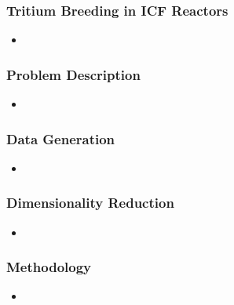 \begin{frame}
	\frametitle{Tritium Breeding in ICF Reactors}
	\begin{itemize}
		\item %
	\end{itemize}
\end{frame}

\begin{frame}
	\frametitle{Problem Description}
	\begin{itemize}
		\item %
	\end{itemize}
\end{frame}

\begin{frame}
	\frametitle{Data Generation}
	\begin{itemize}
		\item %
	\end{itemize}
\end{frame}

\begin{frame}
	\frametitle{Dimensionality Reduction}
	\begin{itemize}
		\item %
	\end{itemize}
\end{frame}

\begin{frame}
	\frametitle{Methodology}
	\begin{itemize}
		\item %
	\end{itemize}
\end{frame}
